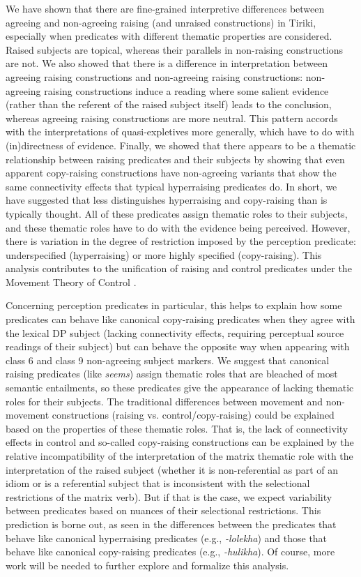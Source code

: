 \documentclass[output=paper,colorlinks,citecolor=brown
]{langscibook}
\begin{document}
We have shown that there are fine-grained interpretive differences between agreeing and non-agreeing raising (and unraised constructions) in Tiriki, especially when predicates with different thematic properties are considered. Raised subjects are topical, whereas their parallels in non-raising constructions are not. We also showed that there is a difference in interpretation between agreeing raising constructions and non-agreeing raising constructions: non-agreeing raising constructions induce a reading where some salient evidence (rather than the referent of the raised subject itself) leads to the conclusion, whereas agreeing raising constructions are more neutral. This pattern accords with the interpretations of quasi-expletives more generally, which have to do with (in)directness of evidence. Finally, we showed that there appears to be a thematic relationship between raising predicates and their subjects by showing that even apparent copy-raising constructions have non-agreeing variants that show the same connectivity effects that typical hyperraising predicates do. In short, we have suggested that less distinguishes hyperraising and copy-raising than is typically thought. All of these predicates assign thematic roles to their subjects, and these thematic roles have to do with the evidence being perceived. However, there is variation in the degree of restriction imposed by the perception predicate: underspecified (hyperraising) or more highly specified (copy-raising). This analysis contributes to the unification of raising and control predicates under the Movement Theory of Control \citep{BoeckxHornsteinNunes:2010}. 

Concerning perception predicates in particular, this helps to explain how some predicates can behave like canonical copy-raising predicates when they agree with the lexical DP subject (lacking connectivity effects, requiring perceptual source readings of their subject) but can behave the opposite way when appearing with class 6 and class 9 non-agreeing subject markers. We suggest that canonical raising predicates (like \textit{seems}) assign thematic roles that are bleached of most semantic entailments, so these predicates give the appearance of lacking thematic roles for their subjects. The traditional differences between movement and non-movement constructions (raising vs. control/copy-raising) could be explained based on the properties of these thematic roles. That is, the lack of connectivity effects in control and so-called copy-raising constructions can be explained by the relative incompatibility of the interpretation of the matrix thematic role with the interpretation of the raised subject (whether it is non-referential as part of an idiom or is a referential subject that is inconsistent with the selectional restrictions of the matrix verb). But if that is the case, we expect variability between predicates based on nuances of their selectional restrictions. This prediction is borne out, as seen in the differences between the predicates that behave like canonical hyperraising predicates (e.g., \textit{-lolekha}) and those that behave like canonical copy-raising predicates (e.g., \textit{-hulikha}). Of course, more work will be needed to further explore and formalize this analysis.
\end{document}
